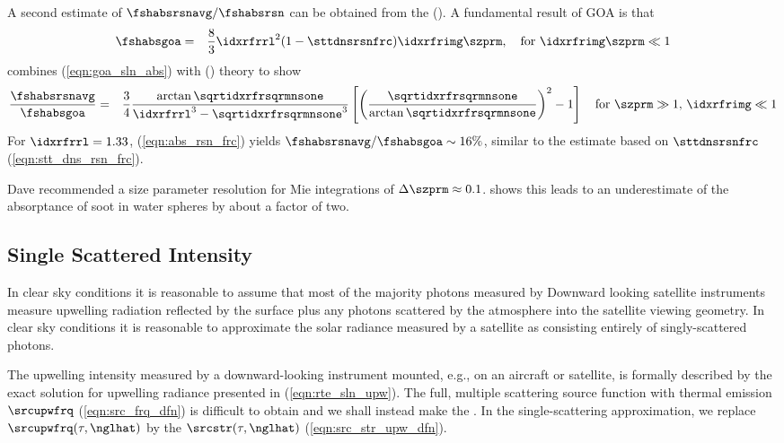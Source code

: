 \documentclass[12pt]{article}
\begin{document}
A second estimate of $\fshabsrsnavg/\fshabsrsn$ can be obtained from
the  ().
A fundamental result of GOA \cite[]{BoH83} is that
\begin{eqnarray}
\fshabsgoa & = & \frac{8}{3} \idxrfrrl^{2} (1-\sttdnsrsnfrc)
\idxrfrimg \szprm, \quad \mbox{for~}\idxrfrimg\szprm \ll 1
\label{eqn:goa_sln_abs}
\end{eqnarray}
\cite{Nus03} combines (\ref{eqn:goa_sln_abs}) with
 () theory to show
\begin{eqnarray}
\frac{\fshabsrsnavg}{\fshabsgoa} & = & \frac{3}{4} 
\frac{\arctan\sqrtidxrfrsqrmnsone}{\idxrfrrl^{3}-\sqrtidxrfrsqrmnsone^{3}}
\left[ \left( \frac{\sqrtidxrfrsqrmnsone}{\arctan \sqrtidxrfrsqrmnsone} \right)^{2}-1 \right]
\quad \mbox{for $\szprm \gg 1$, $\idxrfrimg \ll 1$}  
\label{eqn:abs_rsn_frc}
\end{eqnarray}
For $\idxrfrrl = 1.33$, (\ref{eqn:abs_rsn_frc}) yields
$\fshabsrsnavg/\fshabsgoa \sim 16\%$, similar to the estimate based on
$\sttdnsrsnfrc$ (\ref{eqn:stt_dns_rsn_frc}).

Dave recommended a size parameter resolution for Mie integrations
of $\Delta \szprm \approx 0.1$.
\cite{Mar02} shows this leads to an underestimate of the absorptance
of soot in water spheres by about a factor of two.

\subsection[Single Scattered Intensity]{Single Scattered Intensity}\label{sxn:ssi}
In clear sky conditions it is reasonable to assume that most of the
majority photons measured by 
Downward looking satellite instruments measure upwelling radiation
reflected by the surface plus any photons scattered by the atmosphere
into the satellite viewing geometry. 
In clear sky conditions it is reasonable to approximate the solar
radiance measured by a satellite as consisting entirely of
singly-scattered photons. 

The upwelling intensity measured by a downward-looking instrument
mounted, e.g., on an aircraft or satellite, is formally described 
by the exact solution for upwelling radiance presented in
(\ref{eqn:rte_sln_upw}).
The full, multiple scattering source function with thermal emission
$\srcupwfrq$ (\ref{eqn:src_frq_dfn}) is difficult to obtain and we
shall instead make the . 
In the single-scattering approximation, we replace
$\srcupwfrq(\tau,\nglhat)$ by the 
$\srcstr(\tau,\nglhat)$ (\ref{eqn:src_str_upw_dfn}).
\end{document}
